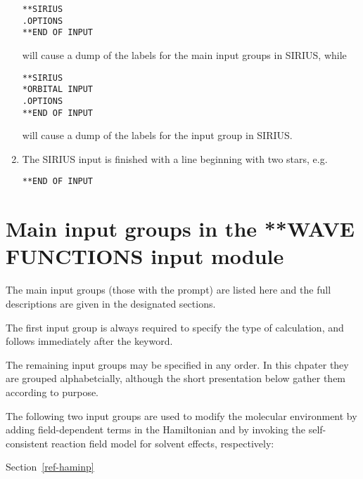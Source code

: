 \begin{enumerate}
{\begin{inputex} \begin{verbatim}
**SIRIUS
.OPTIONS
**END OF INPUT
\end{verbatim} \end{inputex}
   will cause a dump of the labels for the main input groups in SIRIUS,
   while
 
\begin{inputex} \begin{verbatim}
**SIRIUS
*ORBITAL INPUT
.OPTIONS
**END OF INPUT
\end{verbatim} \end{inputex}
   will cause a dump of the labels for the  input group
   in SIRIUS.
}
\item{ The SIRIUS input is finished with a line beginning with two stars,
   e.g.
 
\begin{inputex} \begin{verbatim}
**END OF INPUT
\end{verbatim} \end{inputex}
}
\end{enumerate}
 
 
\pagebreak[3]
\section{\label{sec:ref-newinp}
   Main input groups in the **WAVE FUNCTIONS input module}
 
\noindent
The main input groups (those with the {\starkey} prompt) are listed here and
the full descriptions are given in the designated sections.
 
\noindent
The first input group is always required to specify the type of
calculation, and follows immediately after the 
keyword.
 
 
\noindent
The remaining input groups may be specified in any order. In this
chpater they are grouped alphabetcially, although the short
presentation below gather them according to purpose.

\ifsolvent
The following two input groups are used to modify the
molecular environment by adding field-dependent
terms in the Hamiltonian and by invoking
the self-consistent reaction field model for solvent
effects, respectively:
 
Section~\ref{ref-haminp} 

